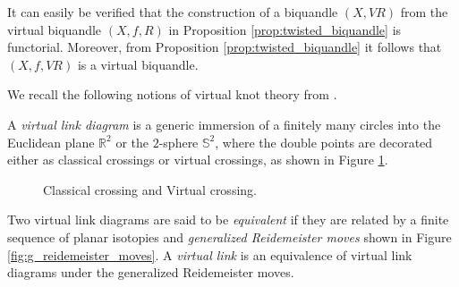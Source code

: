 \documentclass[11pt, reqno]{amsart}
\theoremstyle{definition}
\begin{document}
It can easily be verified that the construction of a biquandle $(X, VR)$ from the virtual biquandle $(X,f,R)$ in Proposition \ref{prop:twisted_biquandle} is functorial.
Moreover, from Proposition \ref{prop:twisted_biquandle} it follows that $(X,f, VR)$ is a virtual biquandle.


We recall the following notions of virtual knot theory from \cite{MR1721925}.

A {\it virtual link diagram} is a generic immersion of a finitely many circles into the Euclidean plane $\mathbb{R}^2$ or the $2$-sphere $\mathbb{S}^2$, where the double points are decorated either as classical crossings or virtual crossings, as shown in Figure \ref{fig:virtual_crossing}.
\begin{figure}[H]




\caption{Classical crossing and Virtual crossing.} \label{fig:virtual_crossing}
\end{figure}

Two virtual link diagrams are said to be {\it equivalent} if they are related by a finite sequence of planar isotopies and {\it generalized Reidemeister moves} shown in Figure \ref{fig:g_reidemeister_moves}. A {\it virtual link} is an equivalence of virtual link diagrams under  the generalized Reidemeister moves.
\end{document}
